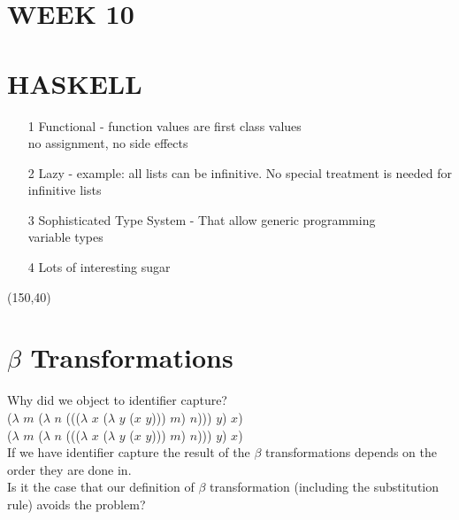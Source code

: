\documentclass{article}
\begin{document}
\begin{flushleft}
 \section*{WEEK 10}
 \section*{HASKELL}
\begin{itemize}
 \item[1] Functional - function values are first class values\\
  no  assignment, no side effects
  \item[2] Lazy - example: all lists can be infinitive. No special treatment is needed for infinitive lists
  \item[3] Sophisticated Type System - That allow generic programming\\
  variable types
  \item[4] Lots of interesting sugar
\end{itemize}
 \begin{flushleft}
 \framebox(150,40){}
 \end{flushleft}
 
 \section*{$\beta$ Transformations}
 \begin{flushleft}
  Why did we object to identifier capture?\\
  ($\lambda$ $\mathit{m}$ ($\lambda$ $\mathit{n}$ ((($\lambda$ $\mathit{x}$ ($\lambda$ $\mathit{y}$ ($\mathit{x}$ $\mathit{y}$))) $\mathit{m}$) $\mathit{n}$))) $\mathit{y}$) $\mathit{x}$) \\
  ($\lambda$ $\mathit{m}$ ($\lambda$ $\mathit{n}$ ((($\lambda$ $\mathit{x}$ ($\lambda$ $\mathit{y}$ ($\mathit{x}$ $\mathit{y}$))) $\mathit{m}$) $\mathit{n}$))) $\mathit{y}$) $\mathit{x}$) \\
  If we have identifier capture the result of the $\beta$ transformations depends on the order they are done in.\\
  \bigskip
  Is it the case that our definition of $\beta$ transformation (including the substitution rule) avoids the problem?\\
  \bigskip

\end{flushleft}
\end{flushleft}
\end{document}
